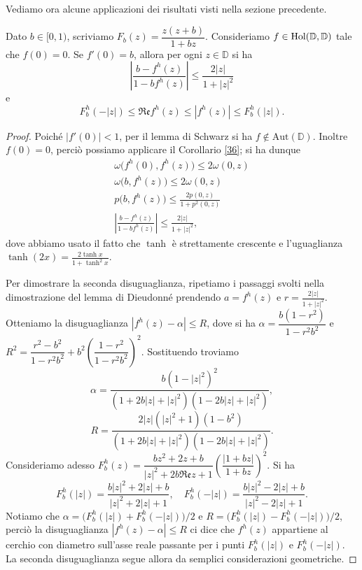 Vediamo ora alcune applicazioni dei risultati visti nella sezione precedente.

\begin{thm} \label{distortion}
  Dato $b \in [0,1)$, scriviamo $F_b(z)=\dfrac{z(z+b)}{1+b z}$. Consideriamo $f \in \normalfont{\text{Hol}}(\mathbb{D},\mathbb{D})$ tale che $f(0)=0$. Se $f'(0)=b$, allora per ogni $z \in \mathbb{D}$ si ha
  \begin{equation}
    \left|\frac{b-f^h(z)}{1-b f^h(z)}\right| \le \frac{2|z|}{1+|z|^2}
  \end{equation}
  e
  \begin{equation}
    F_b^h(-|z|) \le \mathfrak{Re}f^h(z) \le |f^h(z)| \le F_b^h(|z|).
  \end{equation}
\end{thm}

\begin{proof}
  Poiché $|f'(0)|<1$, per il lemma di Schwarz si ha $f \not\in \text{Aut}(\mathbb{D})$. Inoltre $f(0)=0$, perciò possiamo applicare il Corollario \ref{36}; si ha dunque
  \begin{align*}
    \omega\bigl(f^h(0),f^h(z)\bigr) \le 2\omega(0,z) \\
    \omega\bigl(b,f^h(z)\bigr) \le 2\omega(0,z) \\
    p\bigl(b,f^h(z)\bigr) \le \frac{2p(0,z)}{1+p^2(0,z)} \\
    \left|\frac{b-f^h(z)}{1-b f^h(z)}\right| \le \frac{2|z|}{1+|z|^2},
  \end{align*}
  dove abbiamo usato il fatto che $\tanh$ è strettamente crescente e l'uguaglianza $\tanh(2x)=\frac{2\tanh{x}}{1+\tanh^2{x}}$.

  Per dimostrare la seconda disuguaglianza, ripetiamo i passaggi svolti nella dimostrazione del lemma di Dieudonné prendendo $a=f^h(z)$ e $r=\frac{2|z|}{1+|z|^2}$. Otteniamo la disuguaglianza $|f^h(z)-\alpha| \le R$, dove si ha $\alpha=\dfrac{b(1-r^2)}{1-r^2b^2}$ e $R^2=\dfrac{r^2-b^2}{1-r^2b^2}+b^2\left(\dfrac{1-r^2}{1-r^2b^2}\right)^2$. Sostituendo troviamo
  $$\alpha=\frac{b(1-|z|^2)^2}{(1+2b|z|+|z|^2)(1-2b|z|+|z|^2)},$$
  $$R=\frac{2|z|(|z|^2+1)(1-b^2)}{(1+2b|z|+|z|^2)(1-2b|z|+|z|^2)}.$$
  Consideriamo adesso $F_b^h(z)=\dfrac{bz^2+2z+b}{|z|^2+2b\mathfrak{Re}z+1}\left(\dfrac{|1+b z|}{1+b z}\right)^2$. Si ha
  $$F_b^h(|z|)=\dfrac{b|z|^2+2|z|+b}{|z|^2+2|z|+1}, \quad F_b^h(-|z|)=\dfrac{b|z|^2-2|z|+b}{|z|^2-2|z|+1}.$$
  Notiamo che $\alpha=\bigl(F_b^h(|z|)+F_b^h(-|z|)\bigr)/2$ e $R=\bigl(F_b^h(|z|)-F_b^h(-|z|)\bigr)/2$, perciò la disuguaglianza $|f^h(z)-\alpha| \le R$ ci dice che $f^h(z)$ appartiene al cerchio con diametro sull'asse reale passante per i punti $F_b^h(|z|)$ e $F_b^h(-|z|)$. La seconda disuguaglianza segue allora da semplici considerazioni geometriche.
\end{proof}


